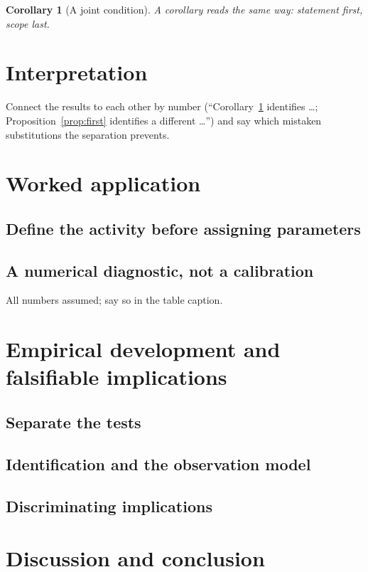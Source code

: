 \documentclass[11pt,a4paper]{article}
\theoremstyle{plain}
\newtheorem{corollary}{Corollary}
\theoremstyle{definition}
\theoremstyle{remark}
\begin{document}
\begin{corollary}[A joint condition]
\label{cor:joint}
A corollary reads the same way: statement first, scope last.
\end{corollary}

\section{Interpretation}

Connect the results to each other by number (``Corollary~\ref{cor:joint} identifies
\ldots; Proposition~\ref{prop:first} identifies a different \ldots'') and say which
mistaken substitutions the separation prevents.

\section{Worked application}

\subsection{Define the activity before assigning parameters}

\subsection{A numerical diagnostic, not a calibration}

All numbers assumed; say so in the table caption.

\section{Empirical development and falsifiable implications}

\subsection{Separate the tests}

\subsection{Identification and the observation model}

\subsection{Discriminating implications}

\section{Discussion and conclusion}
\end{document}
